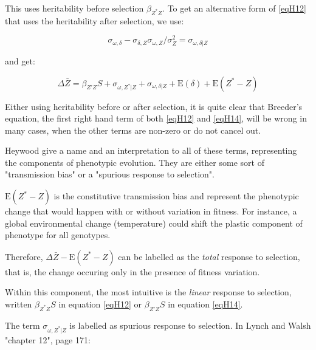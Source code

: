 This uses heritability before selection $\beta_{Z^{\ast}Z}$.
To get an alternative form of \ref{eqH12} that uses the heritability after selection, we use:

\begin{equation}
\sigma_{\omega, \delta} - \sigma_{\delta,Z}\sigma_{\omega,Z}/\sigma_{Z}^2 = \sigma_{\omega,\delta | Z}
\end{equation}

and get:

\begin{equation}
\Delta \bar{Z}=\beta_{Z'Z}S+\sigma_{\omega,Z^{\ast} | Z}+\sigma_{\omega,\delta |Z}+\mathrm{E}(\delta) + \mathrm{E}(Z^{\ast}-Z)
\label{eqH14}
\end{equation}

Either using heritability before or after selection, it is quite clear that Breeder's equation, the first right hand term of both \ref{eqH12} and \ref{eqH14}, will be wrong in many cases, when the other terms are non-zero or do not cancel out.

Heywood give a name and an interpretation to all of these terms, representing the components of phenotypic evolution. They are either some sort of "transmission bias" or a "spurious response to selection". 

$\mathrm{E}(Z^{\ast}-Z)$ is the constitutive transmission bias and represent the phenotypic change that would happen with or without variation in fitness. For instance, a global environmental change (temperature) could shift the plastic component of phenotype for all genotypes.

Therefore, $\Delta \bar{Z} - \mathrm{E}(Z^{\ast}-Z)$ can be labelled as the \emph{total} response to selection, that is, the change occuring only in the presence of fitness variation.

Within this component, the most intuitive is the \textit{linear} response to selection, written $\beta_{Z^{\ast}Z}S$ in equation \ref{eqH12} or $\beta_{Z'Z}S$ in equation \ref{eqH14}.

The term $\sigma_{\omega,Z^{\ast} | Z}$ is labelled as spurious response to selection.
In Lynch and Walsh "chapter 12", page 171:



